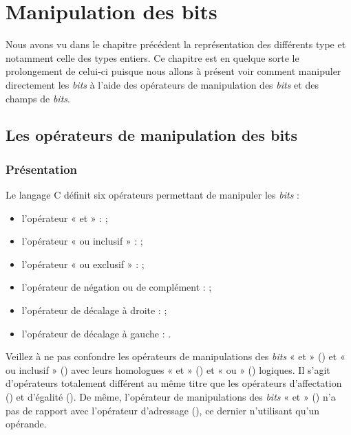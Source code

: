  \chapter{Manipulation des bits}
\label{manipulation-des-bits}

Nous avons vu dans le chapitre précédent la représentation des différents 
type et notamment celle des types entiers. Ce chapitre est en quelque sorte 
le prolongement de celui-ci puisque nous allons à présent voir comment 
manipuler directement les \emph{bits} à l'aide des opérateurs de manipulation
des \emph{bits} et des champs de \emph{bits}.

\section{Les opérateurs de manipulation des bits}
\label{les-operateurs-de-manipulation-des-bits}

\subsection{Présentation}
\label{presentation-6}

Le langage C définit six opérateurs permettant de manipuler les
\emph{bits} :

\begin{itemize}
\item
  l'opérateur « et » : \mybox{\&} ;
\item
  l'opérateur « ou inclusif » : \mybox{\textbar{}} ;
\item
  l'opérateur « ou exclusif » : \mybox{\^{}} ;
\item
  l'opérateur de négation ou de complément : \mybox{\textasciitilde{}}
  ;
\item
  l'opérateur de décalage à droite : \mybox{\textgreater{} \textgreater{}} ;
\item
  l'opérateur de décalage à gauche : \mybox{\textless{} \textless{}}.
\end{itemize}

\begin{erreurbox}
  Veillez à ne pas confondre les opérateurs
de manipulations des \emph{bits} « et » (\mybox{\&}) et « ou inclusif »
(\mybox{\textbar{}}) avec leurs homologues « et » (\mybox{\&\&}) et «
ou » (\mybox{\textbar{}\textbar{}}) logiques. Il s'agit d'opérateurs
totalement différent au même titre que les opérateurs d'affectation
(\mybox{=}) et d'égalité (\mybox{==}). De même, l'opérateur de
manipulations des \emph{bits} « et » (\mybox{\&}) n'a pas de rapport
avec l'opérateur d'adressage (\mybox{\&}), ce dernier n'utilisant qu'un
opérande.
\end{erreurbox}


